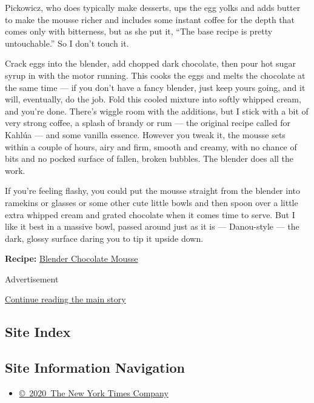 Pickowicz, who does typically make desserts, ups the egg yolks and adds
butter to make the mousse richer and includes some instant coffee for
the depth that comes only with bitterness, but as she put it, ``The base
recipe is pretty untouchable.'' So I don't touch it.

Crack eggs into the blender, add chopped dark chocolate, then pour hot
sugar syrup in with the motor running. This cooks the eggs and melts the
chocolate at the same time --- if you don't have a fancy blender, just
keep yours going, and it will, eventually, do the job. Fold this cooled
mixture into softly whipped cream, and you're done. There's wiggle room
with the additions, but I stick with a bit of very strong coffee, a
splash of brandy or rum --- the original recipe called for Kahlúa ---
and some vanilla essence. However you tweak it, the mousse sets within a
couple of hours, airy and firm, smooth and creamy, with no chance of
bits and no pocked surface of fallen, broken bubbles. The blender does
all the work.

If you're feeling flashy, you could put the mousse straight from the
blender into ramekins or glasses or some other cute little bowls and
then spoon over a little extra whipped cream and grated chocolate when
it comes time to serve. But I like it best in a massive bowl, passed
around just as it is --- Danou-style --- the dark, glossy surface daring
you to tip it upside down.

\textbf{Recipe:}
\href{https://cooking.nytimes3xbfgragh.onion/recipes/1020831-blender-chocolate-mousse}{Blender
Chocolate Mousse}

Advertisement

\protect\hyperlink{after-bottom}{Continue reading the main story}

\hypertarget{site-index}{%
\subsection{Site Index}\label{site-index}}

\hypertarget{site-information-navigation}{%
\subsection{Site Information
Navigation}\label{site-information-navigation}}

\begin{itemize}
\tightlist
\item
  \href{https://help.nytimes3xbfgragh.onion/hc/en-us/articles/115014792127-Copyright-notice}{©~2020~The
  New York Times Company}
\end{itemize}

